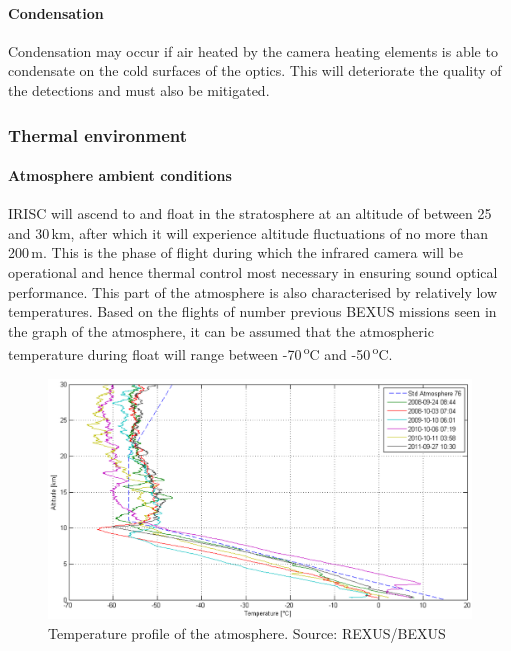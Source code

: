 \paragraph{Condensation}
Condensation may occur if air heated by the camera heating elements is able to condensate on the cold surfaces of the optics. This will deteriorate the quality of the detections and must also be mitigated.  \

\subsubsection{Thermal environment}
\paragraph{Atmosphere ambient conditions}
IRISC will ascend to and float in the stratosphere at an altitude of between 25 and 30\,km, after which it will experience altitude fluctuations of no more than 200\,m. This is the phase of flight during which the infrared camera will be operational and hence thermal control most necessary in ensuring sound optical performance. This part of the atmosphere is also characterised by relatively low temperatures. Based on the flights of number previous BEXUS missions seen in the graph of the atmosphere, it can be assumed that the atmospheric temperature during float will range between -70\,\textsuperscript{o}C and -50\,\textsuperscript{o}C. \\

	\begin{figure}[h!]
    \centering
    \includegraphics[scale=0.6]{4-experiment-design/img/mechanical/atmosphere.PNG}
	\caption{Temperature profile of the atmosphere. Source: REXUS/BEXUS}
	\label{fig:atmosphere}
	\end{figure}

